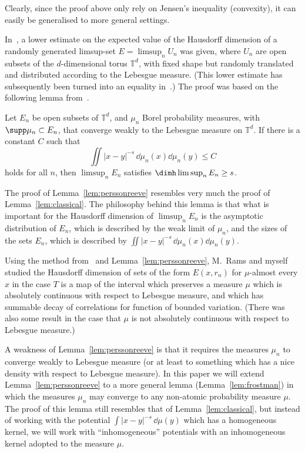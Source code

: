 Clearly, since the proof above only rely on Jensen's inequality (convexity), it can easily be generalised to more general settings.

In~\cite{persson}, a lower estimate on the expected value of the Hausdorff dimension of a randomly generated limsup-set $E = \limsup_n U_n$ was given, where $U_n$ are open subsets of the $d$-dimensional torus $\mathbb{T}^d$, with fixed shape but randomly translated and distributed according to the Lebesgue measure. (This lower estimate has subsequently been turned into an equality in~\cite{fengetal}.) The proof was based on the following lemma from~\cite{perssonreeve}.

\begin{lemm} \label{lem:perssonreeve}
Let $E_n$ be open subsets of\/ $\mathbb{T}^d$, and $\mu_n$ Borel probability measures, with $\supp \mu_n \subset E_n$, that converge weakly to the Lebesgue measure on $\mathbb{T}^d$. If there is a constant $C$ such that
\begin{equation}\label{eq:bounded_energy}
\iint |x - y|^{-s} \, \dd \mu_n (x) \dd \mu_n (y)
\leq C
\end{equation}
holds for all $n$, then $\limsup_n E_n$ satisfies $\dimh \limsup_n E_n \geq s$.
\end{lemm}

The proof of Lemma~\ref{lem:perssonreeve} resembles very much the proof of Lemma~\ref{lem:classical}. The philosophy behind this lemma is that what is important for the Hausdorff dimension of $\limsup_n E_n$ is the asymptotic distribution of $E_n$, which is described by the weak limit of $\mu_n$, and the sizes of the sets $E_n$, which is described by $\iint |x-y|^{-s} \, \dd\mu_n (x) \dd\mu_n (y)$.

Using the method from~\cite{persson} and Lemma~\ref{lem:perssonreeve}, M.~Rams and myself studied the Hausdorff dimension of sets of the form $E(x,r_n)$ for $\mu$-almost every $x$ in the case $T$ is a map of the interval which preserves a measure $\mu$ which is absolutely continuous with respect to Lebesgue measure, and which has summable decay of correlations for function of bounded variation. (There was also some result in the case that $\mu$ is not absolutely continuous with respect to Lebesgue measure.)

A weakness of Lemma~\ref{lem:perssonreeve} is that it requires the measures $\mu_n$ to converge weakly to Lebesgue measure (or at least to something which has a nice density with respect to Lebesgue measure). In this paper we will extend Lemma~\ref{lem:perssonreeve} to a more general lemma (Lemma~\ref{lem:frostman}) in which the measures $\mu_n$ may converge to any non-atomic probability measure $\mu$. The proof of this lemma still resembles that of Lemma~\ref{lem:classical}, but instead of working with the potential $\int |x-y|^{-s} \,
\dd\mu (y)$ which has a homogeneous kernel, we will work with ``inhomogeneous'' potentials with an inhomogeneous kernel adopted to the measure $\mu$.

